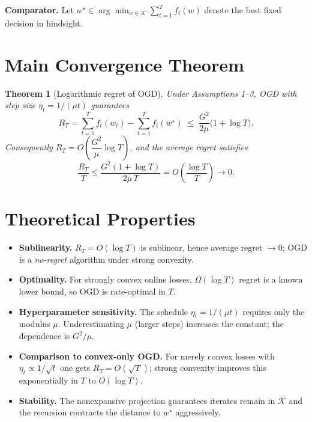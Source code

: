 \documentclass[11pt]{article}
\newtheorem{theorem}{Theorem}
\begin{document}
\noindent\textbf{Comparator.} Let
$w^\star \in \arg\min_{w\in\mathcal{K}} \sum_{t=1}^T f_t(w)$
denote the best fixed decision in hindsight.

\section*{Main Convergence Theorem}

\begin{theorem}[Logarithmic regret of OGD]
Under Assumptions 1--3, OGD with step size $\eta_t = 1/(\mu t)$ guarantees
\[
R_T = \sum_{t=1}^T f_t(w_t) - \sum_{t=1}^T f_t(w^\star)
\;\le\; \frac{G^2}{2\mu}\bigl(1 + \log T\bigr).
\]
Consequently $R_T = O\!\left(\dfrac{G^2}{\mu}\log T\right)$, and the
\emph{average} regret satisfies
\[
\frac{R_T}{T} \le \frac{G^2(1+\log T)}{2\mu\, T} = O\!\left(\frac{\log T}{T}\right)\to 0.
\]
\end{theorem}

\section*{Theoretical Properties}

\begin{itemize}
  \item \textbf{Sublinearity.} $R_T = O(\log T)$ is sublinear, hence average regret $\to 0$;
        OGD is a \emph{no-regret} algorithm under strong convexity.
  \item \textbf{Optimality.} For strongly convex online losses, $\Omega(\log T)$ regret is
        a known lower bound, so OGD is rate-optimal in $T$.
  \item \textbf{Hyperparameter sensitivity.} The schedule $\eta_t=1/(\mu t)$ requires only the
        modulus $\mu$. Underestimating $\mu$ (larger steps) increases the constant; the
        dependence is $G^2/\mu$.
  \item \textbf{Comparison to convex-only OGD.} For merely convex losses with $\eta_t \propto 1/\sqrt{t}$
        one gets $R_T = O(\sqrt{T})$; strong convexity improves this exponentially in $T$ to $O(\log T)$.
  \item \textbf{Stability.} The nonexpansive projection guarantees iterates remain in $\mathcal{K}$ and
        the recursion contracts the distance to $w^\star$ aggressively.
\end{itemize}
\end{document}
